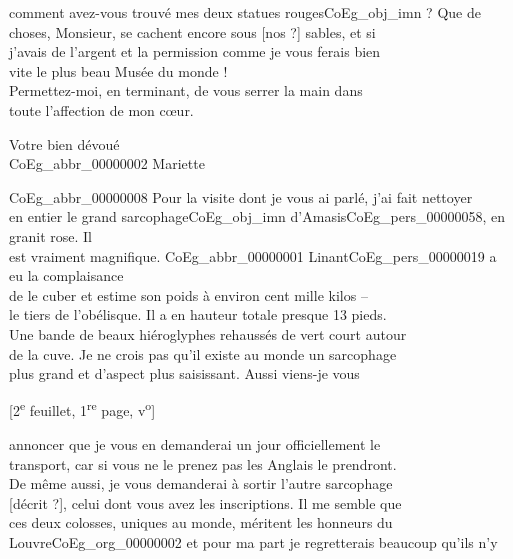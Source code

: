 \documentclass{book}
\begin{document}
comment avez-vous trouvé mes deux statues rouges\gls{CoEg_obj_imn} ? Que de\\
choses, Monsieur, se cachent encore sous [nos ?] sables, et si\\
j’avais de l’argent et la permission comme je vous ferais bien\\
vite le plus beau Musée du monde !\\
\indent Permettez-moi, en terminant, de vous serrer la main dans\\
toute l’affection de mon cœur.
\begin{center}\hspace{5cm} Votre bien dévoué\\
\hspace{5cm} \gls{CoEg_abbr_00000002} Mariette\end{center}
\gls{CoEg_abbr_00000008} Pour la visite dont je vous ai parlé, j’ai fait nettoyer\\
en entier le grand sarcophage\gls{CoEg_obj_imn} d’Amasis\gls{CoEg_pers_00000058}, en granit rose. Il\\
est vraiment magnifique. \gls{CoEg_abbr_00000001} Linant\gls{CoEg_pers_00000019} a eu la complaisance\\
de le cuber et estime son poids à environ cent mille kilos –\\
le tiers de l’obélisque. Il a en hauteur totale presque 13 pieds.\\
Une bande de beaux hiéroglyphes rehaussés de vert court autour\\
de la cuve. Je ne crois pas qu’il existe au monde un sarcophage\\
plus grand et d’aspect plus saisissant. Aussi viens-je vous
{\footnotesize\begin{center} {[2\textsuperscript{e} feuillet, 1\textsuperscript{re} page, v\textsuperscript{o}]}\end{center}}
\noindent annoncer que je vous en demanderai un jour officiellement le\\
transport, car si vous ne le prenez pas les Anglais le prendront.\\
De même aussi, je vous demanderai à sortir l’autre sarcophage\\
{[décrit ?]}, celui dont vous avez les inscriptions. Il me semble que\\
ces deux colosses, uniques au monde, méritent les honneurs du\\
Louvre\gls{CoEg_org_00000002} et pour ma part je regretterais beaucoup qu’ils n’y\\
\end{document}
